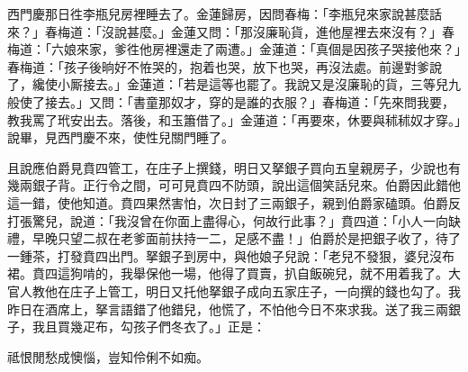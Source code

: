 西門慶那日徃李瓶兒房裡睡去了。金蓮歸房，因問春梅：「李瓶兒來家說甚麼話來？」春梅道：「沒說甚麼。」金蓮又問：「那沒廉恥貨，進他屋裡去來沒有？」春梅道：「六娘來家，爹徃他房裡還走了兩遭。」金蓮道：「真個是因孩子哭接他來？」春梅道：「孩子後晌好不恠哭的，抱着也哭，放下也哭，再沒法處。前邊對爹說了，纔使小厮接去。」金蓮道：「若是這等也罷了。我說又是沒廉恥的貨，三等兒九般使了接去。」又問：「書童那奴才，穿的是誰的衣服？」春梅道：「先來問我要，教我罵了玳安出去。落後，和玉簫借了。」金蓮道：「再要來，休要與秫秫奴才穿。」說畢，見西門慶不來，使性兒關門睡了。

且說應伯爵見賁四管工，在庄子上撰錢，明日又拏銀子買向五皇親房子，少說也有幾兩銀子背。正行令之間，可可見賁四不防頭，說出這個笑話兒來。伯爵因此錯他這一錯，使他知道。賁四果然害怕，次日封了三兩銀子，親到伯爵家磕頭。伯爵反打張驚兒，說道：「我沒曾在你面上盡得心，何故行此事？」賁四道：「小人一向缺禮，早晚只望二叔在老爹面前扶持一二，足感不盡！」伯爵於是把銀子收了，待了一鍾茶，打發賁四出門。拏銀子到房中，與他娘子兒說：「老兒不發狠，婆兒沒布裙。賁四這狗啃的，我舉保他一場，他得了買賣，扒自飯碗兒，就不用着我了。大官人教他在庄子上管工，明日又托他拏銀子成向五家庄子，一向撰的錢也勾了。我昨日在酒席上，拏言語錯了他錯兒，他慌了，不怕他今日不來求我。送了我三兩銀子，我且買幾疋布，勾孩子們冬衣了。」正是：

\begin{myquote} 
祗恨閒愁成懊惱，豈知伶俐不如痴。
\end{myquote} 

